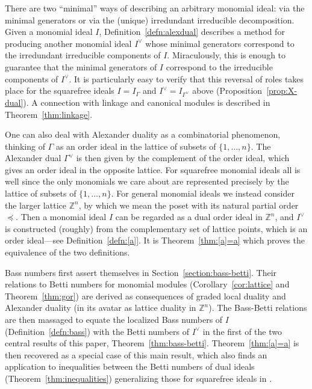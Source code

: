 \documentclass[12pt,leqno]{article}
\def\ZZ{{\mathbb Z}}
\begin{document}
There are two ``minimal'' ways of describing an arbitrary monomial ideal:
via the minimal generators or via the (unique) irredundant irreducible
decomposition.  Given a monomial ideal $I$, Definition~\ref{defn:alexdual}
describes a method for producing another monomial ideal $I^\vee$ whose
minimal generators correspond to the irredundant irreducible components
of $I$.  Miraculously, this is enough to guarantee that the minimal
generators of $I$ correspond to the irreducible components of $I^\vee$.
It is particularly easy to verify that this reversal of roles takes place
for the squarefree ideals $I = I_\Gamma$ and $I^\vee = I_{\Gamma^\vee}$
above (Proposition~\ref{prop:X-dual}).  A connection with linkage and
canonical modules is described in Theorem~\ref{thm:linkage}.

One can also deal with Alexander duality as a combinatorial phenomenon,
thinking of $\Gamma$ as an order ideal in the lattice of subsets of
$\{1,\ldots,n\}$.  The Alexander dual $\Gamma^\vee$ is then given by the
complement of the order ideal, which gives an order ideal in the opposite
lattice.  For squarefree monomial ideals all is well since the only
monomials we care about are represented precisely by the lattice of
subsets of $\{1,\ldots,n\}$.  For general monomial ideals we instead
consider the larger lattice $\ZZ^n$, by which we mean the poset with its
natural partial order $\preceq$.  Then a monomial ideal $I$ can be
regarded as a dual order ideal in $\ZZ^n$, and $I^\vee$ is constructed
(roughly) from the complementary set of lattice points, which is an order
ideal---see Definition~\ref{defn:[a]}.  It is Theorem~\ref{thm:[a]=a}
which proves the equivalence of the two definitions.

Bass numbers first assert themselves in Section~\ref{section:bass-betti}.
Their relations to Betti numbers for monomial modules
(Corollary~\ref{cor:lattice} and Theorem~\ref{thm:gor}) are derived as
consequences of graded local duality and Alexander duality (in its avatar
as lattice duality in $\ZZ^n$).  The Bass-Betti relations are then
massaged to equate the localized Bass numbers of $I$
(Definition~\ref{defn:bass}) with the Betti numbers of $I^\vee$ in the
first of the two central results of this paper,
Theorem~\ref{thm:bass-betti}.  Theorem~\ref{thm:[a]=a} is then recovered
as a special case of this main result, which also finds an application to
inequalities between the Betti numbers of dual ideals
(Theorem~\ref{thm:inequalities}) generalizing those for squarefree ideals
in \cite{BCP}.
\end{document}
